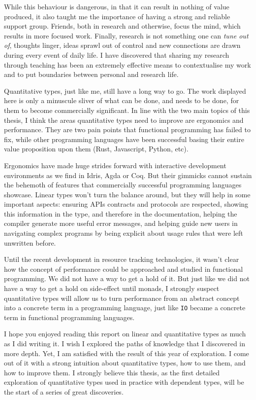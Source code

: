 \documentclass[
]{article}
\begin{document}
While this behaviour is dangerous, in that it can result in nothing of
value produced, it also taught me the importance of having a strong and
reliable support group. Friends, both in research and otherwise, focus
the mind, which results in more focused work. Finally, research is not
something one can \emph{tune out of}, thoughts linger, ideas sprawl out
of control and new connections are drawn during every event of daily
life. I have discovered that sharing my research through teaching has
been an extremely effective means to contextualise my work and to put
boundaries between personal and research life.

Quantitative types, just like me, still have a long way to go. The work
displayed here is only a minuscule sliver of what can be done, and needs
to be done, for them to become commercially significant. In line with
the two main topics of this thesis, I think the areas quantitative types
need to improve are ergonomics and performance. They are two pain points
that functional programming has failed to fix, while other programming
languages have been successful basing their entire value proposition
upon them (Rust, Javascript, Python, etc).

Ergonomics have made huge strides forward with interactive development
environments as we find in Idris, Agda or Coq. But their gimmicks cannot
sustain the behemoth of features that commercially successful
programming languages showcase. Linear types won't turn the balance
around, but they will help in some important aspects: ensuring APIs
contracts and protocols are respected, showing this information in the
type, and therefore in the documentation, helping the compiler generate
more useful error messages, and helping guide new users in navigating
complex programs by being explicit about usage rules that were left
unwritten before.

Until the recent development in resource tracking technologies, it
wasn't clear how the concept of performance could be approached and
studied in functional programming. We did not have a way to get a hold
of it. But just like we did not have a way to get a hold on side-effect
until monads, I strongly suspect quantitative types will allow us to
turn performance from an abstract concept into a concrete term in a
programming language, just like \texttt{IO} became a concrete term in
functional programming languages.

I hope you enjoyed reading this report on linear and quantitative types
as much as I did writing it. I wish I explored the paths of knowledge
that I discovered in more depth. Yet, I am satisfied with the result of
this year of exploration. I come out of it with a strong intuition about
quantitative types, how to use them, and how to improve them. I strongly
believe this thesis, as the first detailed exploration of quantitative
types used in practice with dependent types, will be the start of a
series of great discoveries.
\end{document}
